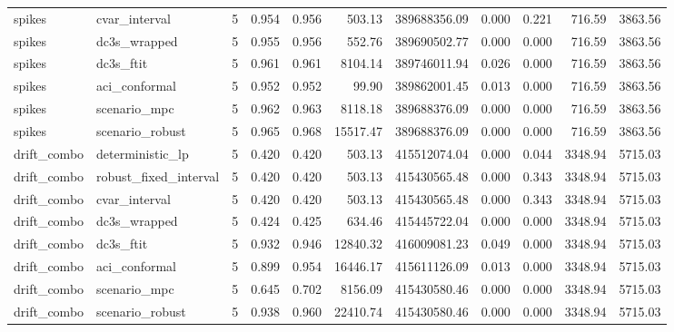 \begin{tabular}{llrrrrrrrrr}
spikes & cvar\_interval & 5 & 0.954 & 0.956 & 503.13 & 389688356.09 & 0.000 & 0.221 & 716.59 & 3863.56 \\
spikes & dc3s\_wrapped & 5 & 0.955 & 0.956 & 552.76 & 389690502.77 & 0.000 & 0.000 & 716.59 & 3863.56 \\
spikes & dc3s\_ftit & 5 & 0.961 & 0.961 & 8104.14 & 389746011.94 & 0.026 & 0.000 & 716.59 & 3863.56 \\
spikes & aci\_conformal & 5 & 0.952 & 0.952 & 99.90 & 389862001.45 & 0.013 & 0.000 & 716.59 & 3863.56 \\
spikes & scenario\_mpc & 5 & 0.962 & 0.963 & 8118.18 & 389688376.09 & 0.000 & 0.000 & 716.59 & 3863.56 \\
spikes & scenario\_robust & 5 & 0.965 & 0.968 & 15517.47 & 389688376.09 & 0.000 & 0.000 & 716.59 & 3863.56 \\
drift\_combo & deterministic\_lp & 5 & 0.420 & 0.420 & 503.13 & 415512074.04 & 0.000 & 0.044 & 3348.94 & 5715.03 \\
drift\_combo & robust\_fixed\_interval & 5 & 0.420 & 0.420 & 503.13 & 415430565.48 & 0.000 & 0.343 & 3348.94 & 5715.03 \\
drift\_combo & cvar\_interval & 5 & 0.420 & 0.420 & 503.13 & 415430565.48 & 0.000 & 0.343 & 3348.94 & 5715.03 \\
drift\_combo & dc3s\_wrapped & 5 & 0.424 & 0.425 & 634.46 & 415445722.04 & 0.000 & 0.000 & 3348.94 & 5715.03 \\
drift\_combo & dc3s\_ftit & 5 & 0.932 & 0.946 & 12840.32 & 416009081.23 & 0.049 & 0.000 & 3348.94 & 5715.03 \\
drift\_combo & aci\_conformal & 5 & 0.899 & 0.954 & 16446.17 & 415611126.09 & 0.013 & 0.000 & 3348.94 & 5715.03 \\
drift\_combo & scenario\_mpc & 5 & 0.645 & 0.702 & 8156.09 & 415430580.46 & 0.000 & 0.000 & 3348.94 & 5715.03 \\
drift\_combo & scenario\_robust & 5 & 0.938 & 0.960 & 22410.74 & 415430580.46 & 0.000 & 0.000 & 3348.94 & 5715.03 \\
\bottomrule
\end{tabular}
